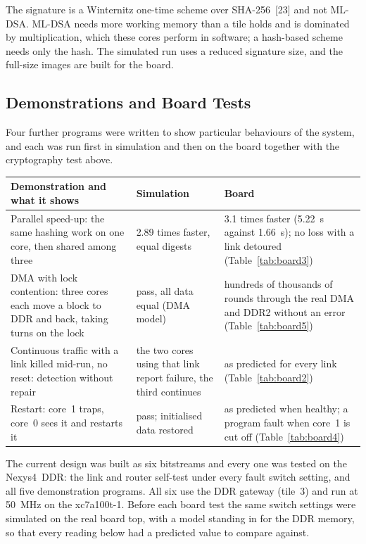 \documentclass[11pt,a4paper]{article}
\begin{document}
The signature is a Winternitz one-time scheme over SHA-256~[23] and not
ML-DSA. ML-DSA needs more working memory than a tile holds and is dominated
by multiplication, which these cores perform in software; a hash-based scheme
needs only the hash. The simulated run uses a reduced signature size, and the
full-size images are built for the board.

\subsection{Demonstrations and Board Tests}

Four further programs were written to show particular behaviours of the
system, and each was run first in simulation and then on the board together
with the cryptography test above.

\begin{tabularx}{\textwidth}{@{}YYY@{}}
\toprule
\textbf{Demonstration and what it shows} & \textbf{Simulation} &
\textbf{Board} \\
\midrule
Parallel speed-up: the same hashing work on one core, then shared among
three & 2.89 times faster, equal digests & 3.1 times faster (5.22~s against
1.66~s); no loss with a link detoured (Table~\ref{tab:board3}) \\
DMA with lock contention: three cores each move a block to DDR and back,
taking turns on the lock & pass, all data equal (DMA model) & hundreds of
thousands of rounds through the real DMA and DDR2 without an error
(Table~\ref{tab:board5}) \\
Continuous traffic with a link killed mid-run, no reset: detection without
repair & the two cores using that link report failure, the third continues &
as predicted for every link (Table~\ref{tab:board2}) \\
Restart: core~1 traps, core~0 sees it and restarts it & pass; initialised
data restored & as predicted when healthy; a program fault when core~1 is cut
off (Table~\ref{tab:board4}) \\
\bottomrule
\end{tabularx}

The current design was built as six bitstreams and every one was tested on
the Nexys4~DDR: the link and router self-test under every fault
switch setting, and all five demonstration programs. All six use the DDR
gateway (tile~3) and run at 50~MHz on the xc7a100t-1. Before each board test
the same switch settings were simulated on the real board top, with a model
standing in for the DDR memory, so that every reading below had a predicted
value to compare against.
\end{document}

